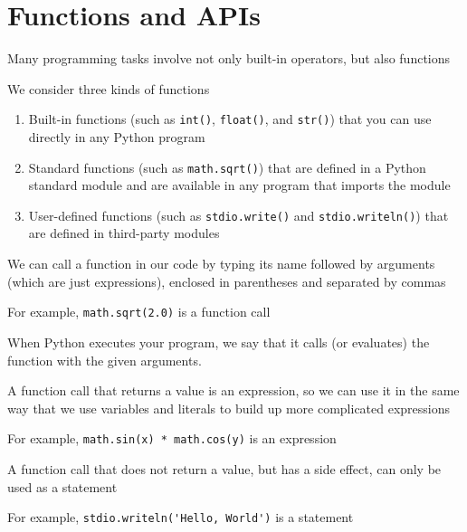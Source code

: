\documentclass[8pt,a4paper,compress]{beamer}
\begin{document}
\section{Functions and APIs}
\begin{frame}[fragile]
\pause

Many programming tasks involve not only built-in operators, but also functions

\pause
\bigskip

We consider three kinds of functions
\begin{enumerate}
\item Built-in functions (such as \lstinline{int()}, \lstinline{float()}, and \lstinline{str()}) that you can use directly in any Python program

\item Standard functions (such as \lstinline{math.sqrt()}) that are defined in a Python standard module and are available in any program that imports the module

\item User-defined functions (such as \lstinline{stdio.write()} and \lstinline{stdio.writeln()}) that are defined in third-party modules
\end{enumerate}

\pause
\bigskip

We can call a function in our code by typing its name followed by arguments (which are just expressions), enclosed in parentheses and separated by commas

\pause
\bigskip

For example, \lstinline{math.sqrt(2.0)} is a function call

\pause
\bigskip

When Python executes your program, we say that it calls (or evaluates) the function with the given arguments.

\pause
\bigskip

A function call that returns a value is an expression, so we can use it in the same way that we use variables and literals to build up more complicated expressions

\pause
\bigskip

For example, \lstinline{math.sin(x) * math.cos(y)} is an expression

\pause
\bigskip

A function call that does not return a value, but has a side effect, can only be used as a statement

\pause
\bigskip

For example, \lstinline{stdio.writeln('Hello, World')} is a statement
\end{frame}
\end{document}
